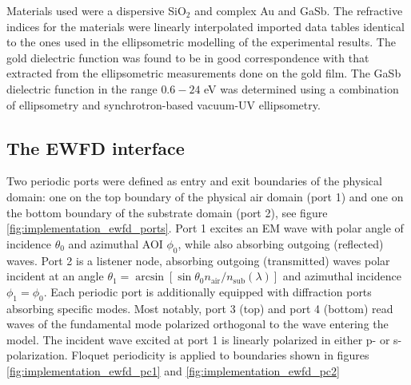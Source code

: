 
Materials used were a dispersive SiO$_2$ and complex Au and GaSb. The refractive indices for the materials were linearly interpolated imported data tables identical to the ones used in the ellipsometric modelling of the experimental results. The gold dielectric function was found to be in good correspondence with that extracted from the ellipsometric measurements done on the gold film\cite{brakstad_thesis}. The GaSb dielectric function in the range $0.6-24$ eV was determined using a combination of ellipsometry and synchrotron-based vacuum-UV ellipsometry\cite{gasb_nk}. 

\subsection{The EWFD interface}
Two periodic ports were defined as entry and exit boundaries of the physical domain: one on the top boundary of the physical air domain (port 1) and one on the bottom boundary of the substrate domain (port 2), see figure \ref{fig:implementation_ewfd_ports}. Port 1 excites an EM wave with polar angle of incidence $\theta_0$ and azimuthal AOI $\phi_0$, while also absorbing outgoing (reflected) waves. Port 2 is a listener node, absorbing outgoing (transmitted) waves polar incident at an angle $\theta_1 = \arcsin[\sin\theta_0 n_{\text{air}}/n_{\text{sub}}(\lambda)]$ and azimuthal incidence $\phi_1=\phi_0$. Each periodic port is additionally equipped with diffraction ports absorbing specific modes. Most notably, port 3 (top) and port 4 (bottom) read waves of the fundamental mode polarized orthogonal to the wave entering the model. The incident wave excited at port 1 is linearly polarized in either p- or s-polarization. Floquet periodicity is applied to boundaries shown in figures \ref{fig:implementation_ewfd_pc1} and \ref{fig:implementation_ewfd_pc2}

